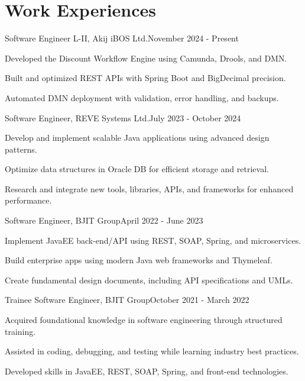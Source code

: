 \section{\textbf{Work Experiences}}
\begin{joblong}
{Software Engineer L-II, Akij iBOS Ltd.}{November 2024 - Present}
    \item Developed the Discount Workflow Engine using Camunda, Drools, and DMN.
    \item Built and optimized REST APIs with Spring Boot and BigDecimal precision.
    \item Automated DMN deployment with validation, error handling, and backups.
\end{joblong}

\begin{joblong}
{Software Engineer, REVE Systems Ltd.}{July 2023 - October 2024}
    \item Develop and implement scalable Java applications using advanced design patterns.
    \item Optimize data structures in Oracle DB for efficient storage and retrieval.
    \item Research and integrate new tools, libraries, APIs, and frameworks for enhanced performance.
\end{joblong}

\begin{joblong}
{Software Engineer, BJIT Group}{April 2022 - June 2023}
    \item Implement JavaEE back-end/API using REST, SOAP, Spring, and microservices.
    \item Build enterprise apps using modern Java web frameworks and Thymeleaf.
    \item Create fundamental design documents, including API specifications and UMLs.
\end{joblong}

\begin{joblong}
{Trainee Software Engineer, BJIT Group}{October 2021 - March 2022}
    \item Acquired foundational knowledge in software engineering through structured training.
    \item Assisted in coding, debugging, and testing while learning industry best practices.
    \item Developed skills in JavaEE, REST, SOAP, Spring, and front-end technologies.
\end{joblong}
